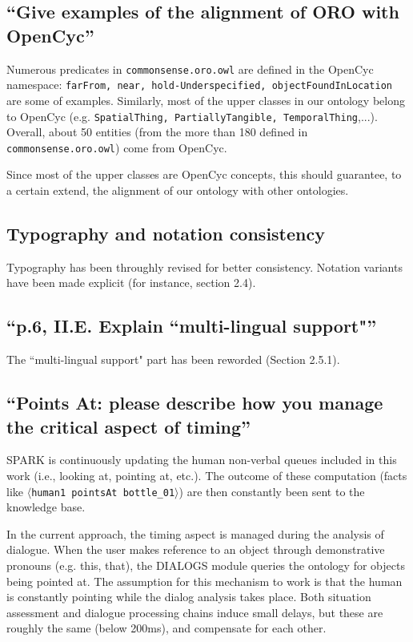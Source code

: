 \documentclass[11pt]{article}
\begin{document}
\subsection{``Give examples of the alignment of ORO with OpenCyc''}

Numerous predicates in {\tt commonsense.oro.owl} are defined in the OpenCyc
namespace: {\tt farFrom, near, hold-Underspecified, objectFoundInLocation} are
some of examples. Similarly, most of the upper classes in our ontology belong
to OpenCyc (e.g. {\tt SpatialThing, PartiallyTangible, TemporalThing},...).
Overall, about 50 entities (from the more than 180 defined in {\tt
commonsense.oro.owl}) come from OpenCyc.

Since most of the upper classes are OpenCyc concepts, this should 
guarantee, to a certain extend, the alignment of our ontology with other ontologies.

\subsection{Typography and notation consistency}

Typography has been throughly revised for better consistency. Notation variants have been
made explicit (for instance, section 2.4).

\subsection{``p.6, II.E. Explain ``multi-lingual support"''}

The ``multi-lingual support" part has been reworded (Section 2.5.1).

\subsection{``Points At: please describe how you manage the critical aspect of
timing''}

SPARK is continuously updating the human non-verbal queues included in this
work (i.e., looking at, pointing at, etc.). The outcome of these computation
(facts like {\tt $\langle$human1 pointsAt bottle\_01$\rangle$}) are then
constantly been sent to the knowledge base.

In the current approach, the timing aspect is managed during the analysis of
dialogue. When the user makes reference to an object through demonstrative pronouns
(e.g. this, that), the DIALOGS module queries the ontology for objects being
pointed at. The assumption for this mechanism to work is that the human is
constantly pointing while the dialog analysis takes place.  Both situation
assessment and dialogue processing chains induce small delays, but these are
roughly the same (below 200ms), and compensate for each other. 
\end{document}
